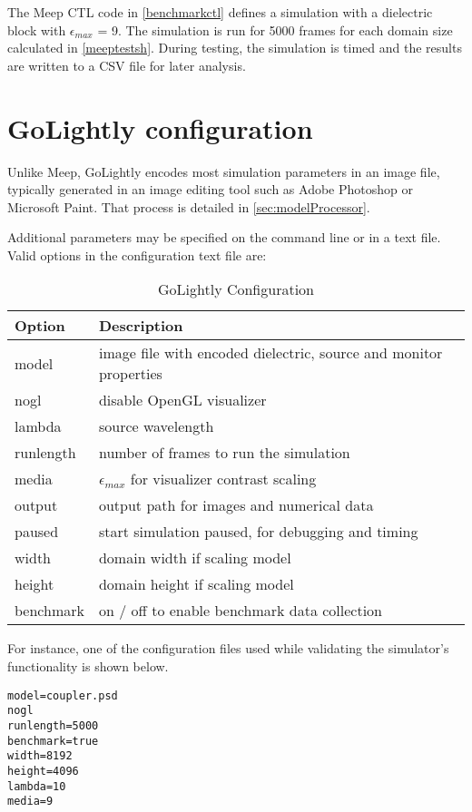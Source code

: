 


The Meep CTL code in \autoref{benchmarkctl} defines a simulation with a dielectric block with $\epsilon_{max}$ = 9. The simulation is run for 5000 frames for each domain size calculated in \autoref{meeptestsh}. During testing, the simulation is timed and the results are written to a CSV file for later analysis. 



\section{GoLightly configuration}

Unlike Meep, GoLightly encodes most simulation parameters in an image file, typically generated in an image editing tool such as Adobe Photoshop or Microsoft Paint. That process is detailed in \autoref{sec:modelProcessor}. 

Additional parameters may be specified on the command line or in a text file. Valid options in the configuration text file are:

\begin{table}[h!]
	\label{golightlyConfig}
	\centering
	\caption{GoLightly Configuration}
	\label{tab:golightlyConfigTerms}
	\begin{tabular}{l | l}
		Option	& Description \\
		\hline
			model     & image file with encoded dielectric, source and monitor properties \\
			nogl      & disable OpenGL visualizer										  \\
			lambda    & source wavelength												  \\
			runlength & number of frames to run the simulation							  \\
			media     & $\epsilon_{max}$  for visualizer contrast scaling								  \\
			output    & output path for images and numerical data						  \\
			paused    & start simulation paused, for debugging and timing				  \\
			width     & domain width if scaling model									  \\
			height    & domain height if scaling model									  \\
			benchmark & on / off to enable benchmark data collection									  \\
	\end{tabular}
\end{table}

For instance, one of the configuration files used while validating the simulator's functionality is shown below.

\begin{lstlisting}[caption={Samply GoLightly Configuration File},label={listing:sampleGolightlyConfig}]
model=coupler.psd
nogl
runlength=5000
benchmark=true
width=8192
height=4096
lambda=10
media=9
\end{lstlisting}




